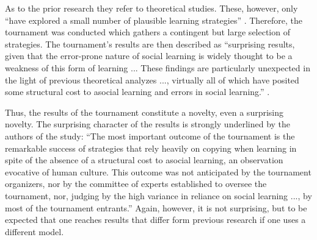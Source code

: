 \documentclass[graybox, English]{svmult}
\begin{document}
As to the prior research they refer to theoretical studies. These,
however, only “have explored a small number of plausible learning
strategies” \citep[]{rendell-et-al:2010a}. Therefore, the tournament was
conducted which gathers a contingent but large selection of
strategies. The tournament’s results are then described as “surprising
results, given that the error-prone nature of social learning is
widely thought to be a weakness of this form of learning ... These
findings are particularly unexpected in the light of previous
theoretical analyzes ..., virtually all of which have
posited some structural cost to asocial learning and errors in social
learning.” \citep[212]{rendell-et-al:2010a}.

Thus, the results of the tournament constitute a novelty, even a
surprising novelty. The surprising character of the results is
strongly underlined by the authors of the study: “The most important
outcome of the tournament is the remarkable success of strategies that
rely heavily on copying when learning in spite of the absence of a
structural cost to asocial learning, an observation evocative of human
culture. This outcome was not anticipated by the tournament
organizers, nor by the committee of experts established to oversee the
tournament, nor, judging by the high variance in reliance on social
learning ..., by most of the tournament entrants.”
\citep[212]{rendell-et-al:2010a} Again, however, it is not surprising, but to be
expected that one reaches results that differ form previous research if
one uses a different model.
\end{document}
